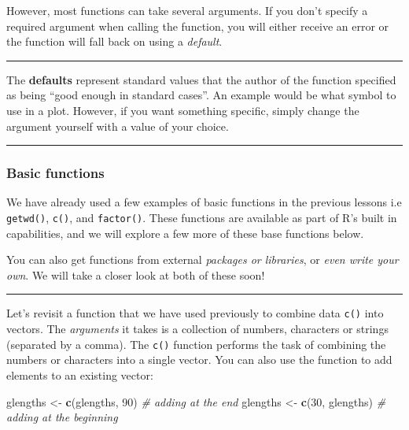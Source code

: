 \documentclass[
]{article}
\newenvironment{Shaded}{\begin{snugshade}}{\end{snugshade}}
\newcommand{\CommentTok}[1]{\textcolor[rgb]{0.56,0.35,0.01}{\textit{#1}}}
\newcommand{\DecValTok}[1]{\textcolor[rgb]{0.00,0.00,0.81}{#1}}
\newcommand{\KeywordTok}[1]{\textcolor[rgb]{0.13,0.29,0.53}{\textbf{#1}}}
\newcommand{\NormalTok}[1]{#1}
\newcommand{\StringTok}[1]{\textcolor[rgb]{0.31,0.60,0.02}{#1}}
\begin{document}
However, most functions can take several arguments. If you don't specify
a required argument when calling the function, you will either receive
an error or the function will fall back on using a \emph{default}.

\begin{center}\rule{0.5\linewidth}{0.5pt}\end{center}

The \textbf{defaults} represent standard values that the author of the
function specified as being ``good enough in standard cases''. An
example would be what symbol to use in a plot. However, if you want
something specific, simply change the argument yourself with a value of
your choice.

\begin{center}\rule{0.5\linewidth}{0.5pt}\end{center}

\hypertarget{basic-functions}{%
\subsubsection{Basic functions}\label{basic-functions}}

We have already used a few examples of basic functions in the previous
lessons i.e \texttt{getwd()}, \texttt{c()}, and \texttt{factor()}. These
functions are available as part of R's built in capabilities, and we
will explore a few more of these base functions below.

You can also get functions from external \emph{packages or libraries},
or \emph{even write your own}. We will take a closer look at both of
these soon!

\begin{center}\rule{0.5\linewidth}{0.5pt}\end{center}

Let's revisit a function that we have used previously to combine data
\texttt{c()} into vectors. The \emph{arguments} it takes is a collection
of numbers, characters or strings (separated by a comma). The
\texttt{c()} function performs the task of combining the numbers or
characters into a single vector. You can also use the function to add
elements to an existing vector:

\begin{Shaded}
\begin{Highlighting}[]
\NormalTok{glengths <-}\StringTok{ }\KeywordTok{c}\NormalTok{(glengths, }\DecValTok{90}\NormalTok{) }\CommentTok{# adding at the end }
\NormalTok{glengths <-}\StringTok{ }\KeywordTok{c}\NormalTok{(}\DecValTok{30}\NormalTok{, glengths) }\CommentTok{# adding at the beginning}
\end{Highlighting}
\end{Shaded}
\end{document}
